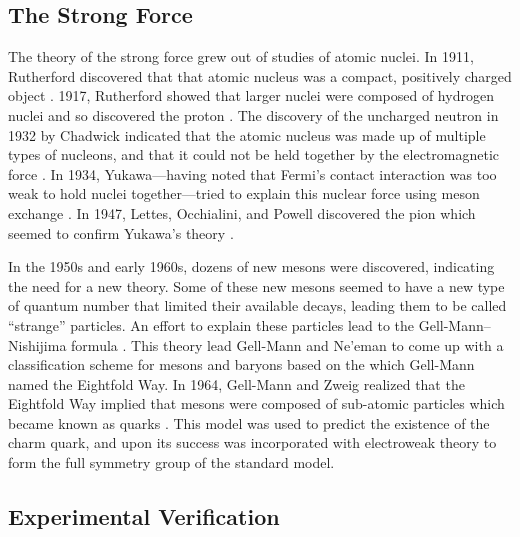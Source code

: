 \subsection{The Strong Force}
\label{subsection:Strong_force}

The theory of the strong force grew out of studies of atomic nuclei. In 1911,
Rutherford discovered that that atomic nucleus was a compact, positively
charged object \cite{rutherford1911}. 1917, Rutherford showed that larger
nuclei were composed of hydrogen nuclei and so discovered the proton
\cite{rutherford1919}. The discovery of the uncharged neutron in 1932 by
Chadwick indicated that the atomic nucleus was made up of multiple types of
nucleons, and that it could not be held together by the electromagnetic force
\cite{chadwick1932}. In 1934, Yukawa---having noted that Fermi's contact
interaction was too weak to hold nuclei together---tried to explain this
nuclear force using meson exchange \cite{yukawa1935}. In 1947, Lettes,
Occhialini, and Powell discovered the pion which seemed to confirm Yukawa's
theory \cite{lattes1947}.

In the 1950s and early 1960s, dozens of new mesons were discovered, indicating
the need for a new theory. Some of these new mesons seemed to have a new type
of quantum number that limited their available decays, leading them to be
called ``strange'' particles. An effort to explain these particles lead to the
Gell-Mann--Nishijima formula
\cite{nakano1953}\cite{nishijima1955}\cite{gellmann1956}. This theory lead
Gell-Mann and Ne'eman to come up with a classification scheme for mesons and
baryons based on the \SUthree which Gell-Mann named the Eightfold Way. In 1964,
Gell-Mann and Zweig realized that the Eightfold Way implied that mesons were
composed of sub-atomic particles which became known as quarks
\cite{gellmann1964}\cite{zweig1964}. This model was used to predict the
existence of the charm quark, and upon its success was incorporated with
electroweak theory to form the full \SUthreeSUtwoUone symmetry group of the
standard model.

\subsection{Experimental Verification}

